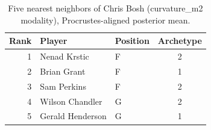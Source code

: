 \begin{table}[htbp]
  \centering\small
  \begin{tabular}{rllc}
    \toprule
    Rank & Player & Position & Archetype \\
    \midrule
    1 & Nenad Krstic & F & 2 \\
    2 & Brian Grant & F & 1 \\
    3 & Sam Perkins & F & 2 \\
    4 & Wilson Chandler & G & 2 \\
    5 & Gerald Henderson & G & 1 \\
    \bottomrule
  \end{tabular}
  \caption{Five nearest neighbors of Chris Bosh (curvature_m2 modality), Procrustes-aligned posterior mean.}
  \label{tab:Chris_Bosh_neighbors_curvature_m2}
\end{table}

